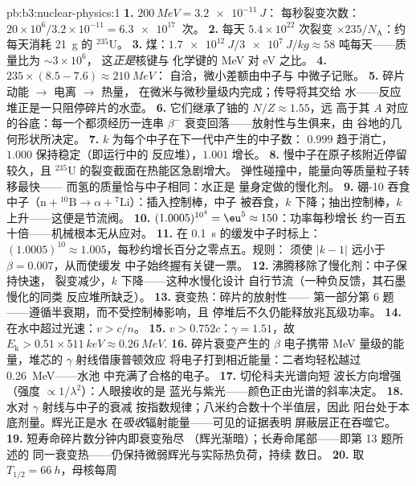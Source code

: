 \begin{solution}{pb:b3:nuclear-physics:1}
\textbf{1.} $\qty{200}{MeV} = \qty{3.2e-11}{J}$：
每秒裂变次数：$20\times10^6/3.2\times10^{-11} = \qty{6.3e17}{}$
次。
\textbf{2.} 每天 $5.4\times10^{22}$ 次裂变 $\times
235/N_{\text{A}}$：约每天消耗 \qty{21}{g} 的 $^{235}$U。
\textbf{3.} 煤：$\qty{1.7e12}{J}/\qty{3e7}{J/kg} \approx 58$
吨每天——质量比为 $\sim3\times10^{6}$，
这\emph{正是}核键与
化学键的 \unit{MeV} 对 \unit{eV} 之比。
\textbf{4.} $235\times(8.5 - 7.6) \approx \qty{210}{MeV}$：
自洽，微小差额由中子与
中微子记账。
\textbf{5.} 碎片动能 $\to$ 电离 $\to$ 热量，
在微米与微秒量级内完成；传导将其交给
水——反应堆正是一只阻停碎片的水壶。
\textbf{6.} 它们继承了铀的 $N/Z \approx 1.55$，远
高于其 $A$ 对应的谷底：每一个都须经历一连串
$\beta^-$ 衰变回落——放射性与生俱来，由
谷地的几何形状所决定。
\textbf{7.} $k$ 为每个中子在下一代中产生的中子数：
$0.999$ 趋于消亡，$1.000$ 保持稳定（即运行中的
反应堆），$1.001$ 增长。
\textbf{8.} 慢中子在原子核附近停留较久，且
$^{235}$U 的裂变截面在热能区急剧增大。
弹性碰撞中，能量向等质量粒子转移最快——
而氢的质量恰与中子相同：水正是
量身定做的慢化剂。
\textbf{9.} 硼-10 吞食中子（$\text{n} + {}^{10}
\text{B} \to \alpha + {}^{7}\text{Li}$）：插入控制棒，中子
被吞食，$k$ 下降；抽出控制棒，$k$ 上升——这便是节流阀。
\textbf{10.} $(1.0005)^{10^4} = \eu^{5} \approx 150$：功率每秒增长
约一百五十倍——机械根本无从应对。
\textbf{11.} 在 \qty{0.1}{s} 的缓发中子时标上：
$(1.0005)^{10} \approx 1.005$，每秒约增长百分之零点五。规则：
须使 $|k - 1|$ 远小于 $\beta = 0.007$，从而使缓发
中子始终握有关键一票。
\textbf{12.} 沸腾移除了慢化剂：中子保持快速，
裂变减少，$k$ 下降——这种水慢化设计
自行节流（一种负反馈，其石墨慢化的同类
反应堆所缺乏）。
\textbf{13.} 衰变热：碎片的放射性——
第一部分第 6 题——遵循半衰期，而不受控制棒影响，且
停堆后不久仍能释放兆瓦级功率。
\textbf{14.} 在水中超过光速：$v > c/n$。
\textbf{15.} $v > 0.752c$：$\gamma = 1.51$，故 $E_{\text{k}} >
0.51\times\qty{511}{keV} \approx \qty{0.26}{MeV}$.
\textbf{16.} 碎片衰变产生的 $\beta$ 电子携带
\unit{MeV} 量级的能量，堆芯的 $\gamma$ 射线借康普顿效应
将电子打到相近能量：二者均轻松越过 \qty{0.26}{MeV}——水池
中充满了合格的电子。
\textbf{17.} 切伦科夫光谱向短
波长方向增强（强度 $\propto1/\lambda^2$）：人眼接收的是
蓝光与紫光——颜色正由光谱的斜率决定。
\textbf{18.} 水对 $\gamma$ 射线与中子的衰减
按指数规律；八米约合数十个半值层，因此
阳台处于本底剂量。辉光正是水
在\emph{吸收}辐射能量——可见的证据表明
屏蔽层正在吞噬它。
\textbf{19.} 短寿命碎片数分钟内即衰变殆尽
（辉光渐暗）；长寿命尾部——即第 13 题所述的
同一衰变热——仍保持微弱辉光与实际热负荷，持续
数日。
\textbf{20.} 取 $T_{1/2} = \qty{66}{h}$，母核每周

\end{solution}
